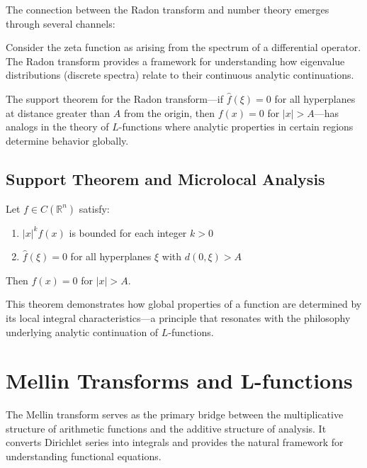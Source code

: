 The connection between the Radon transform and number theory emerges through several channels:

\begin{example}
Consider the zeta function as arising from the spectrum of a differential operator. The Radon transform provides a framework for understanding how eigenvalue distributions (discrete spectra) relate to their continuous analytic continuations.
\end{example}

\begin{remark}
The support theorem for the Radon transform—if $\hat{f}(\xi) = 0$ for all hyperplanes at distance greater than $A$ from the origin, then $f(x) = 0$ for $|x| > A$—has analogs in the theory of $L$-functions where analytic properties in certain regions determine behavior globally.
\end{remark}

\subsection{Support Theorem and Microlocal Analysis}

\begin{theorem}
Let $f \in C(\mathbb{R}^n)$ satisfy:
\begin{enumerate}
\item $|x|^k f(x)$ is bounded for each integer $k > 0$
\item $\hat{f}(\xi) = 0$ for all hyperplanes $\xi$ with $d(0,\xi) > A$
\end{enumerate}
Then $f(x) = 0$ for $|x| > A$.
\end{theorem}

This theorem demonstrates how global properties of a function are determined by its local integral characteristics—a principle that resonates with the philosophy underlying analytic continuation of $L$-functions.

\section{Mellin Transforms and L-functions}
\label{sec:mellin-transforms}

The Mellin transform serves as the primary bridge between the multiplicative structure of arithmetic functions and the additive structure of analysis. It converts Dirichlet series into integrals and provides the natural framework for understanding functional equations.

